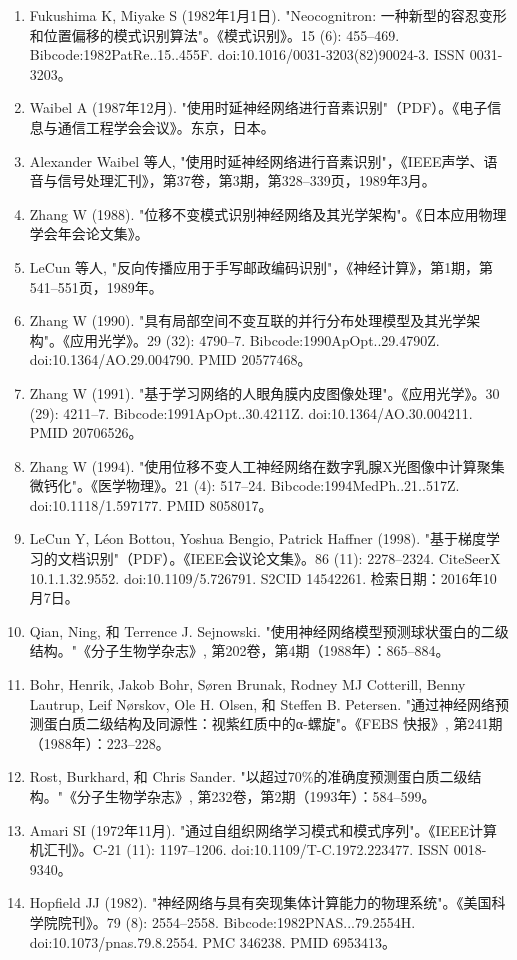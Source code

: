 \begin{enumerate}
\item Fukushima K, Miyake S (1982年1月1日). "Neocognitron: 一种新型的容忍变形和位置偏移的模式识别算法"。《模式识别》。15 (6): 455–469. Bibcode:1982PatRe..15..455F. doi:10.1016/0031-3203(82)90024-3. ISSN 0031-3203。
\item Waibel A (1987年12月). "使用时延神经网络进行音素识别"（PDF）。《电子信息与通信工程学会会议》。东京，日本。
\item Alexander Waibel 等人, "使用时延神经网络进行音素识别"，《IEEE声学、语音与信号处理汇刊》，第37卷，第3期，第328–339页，1989年3月。
\item Zhang W (1988). "位移不变模式识别神经网络及其光学架构"。《日本应用物理学会年会论文集》。
\item LeCun 等人, "反向传播应用于手写邮政编码识别"，《神经计算》，第1期，第541–551页，1989年。
\item Zhang W (1990). "具有局部空间不变互联的并行分布处理模型及其光学架构"。《应用光学》。29 (32): 4790–7. Bibcode:1990ApOpt..29.4790Z. doi:10.1364/AO.29.004790. PMID 20577468。
\item Zhang W (1991). "基于学习网络的人眼角膜内皮图像处理"。《应用光学》。30 (29): 4211–7. Bibcode:1991ApOpt..30.4211Z. doi:10.1364/AO.30.004211. PMID 20706526。
\item Zhang W (1994). "使用位移不变人工神经网络在数字乳腺X光图像中计算聚集微钙化"。《医学物理》。21 (4): 517–24. Bibcode:1994MedPh..21..517Z. doi:10.1118/1.597177. PMID 8058017。
\item LeCun Y, Léon Bottou, Yoshua Bengio, Patrick Haffner (1998). "基于梯度学习的文档识别"（PDF）。《IEEE会议论文集》。86 (11): 2278–2324. CiteSeerX 10.1.1.32.9552. doi:10.1109/5.726791. S2CID 14542261. 检索日期：2016年10月7日。
\item Qian, Ning, 和 Terrence J. Sejnowski. "使用神经网络模型预测球状蛋白的二级结构。"《分子生物学杂志》, 第202卷，第4期（1988年）：865–884。
\item Bohr, Henrik, Jakob Bohr, Søren Brunak, Rodney MJ Cotterill, Benny Lautrup, Leif Nørskov, Ole H. Olsen, 和 Steffen B. Petersen. "通过神经网络预测蛋白质二级结构及同源性：视紫红质中的α-螺旋"。《FEBS 快报》, 第241期（1988年）：223–228。
\item Rost, Burkhard, 和 Chris Sander. "以超过70\%的准确度预测蛋白质二级结构。"《分子生物学杂志》, 第232卷，第2期（1993年）：584–599。
\item Amari SI (1972年11月). "通过自组织网络学习模式和模式序列"。《IEEE计算机汇刊》。C-21 (11): 1197–1206. doi:10.1109/T-C.1972.223477. ISSN 0018-9340。
\item Hopfield JJ (1982). "神经网络与具有突现集体计算能力的物理系统"。《美国科学院院刊》。79 (8): 2554–2558. Bibcode:1982PNAS...79.2554H. doi:10.1073/pnas.79.8.2554. PMC 346238. PMID 6953413。

\end{enumerate}
